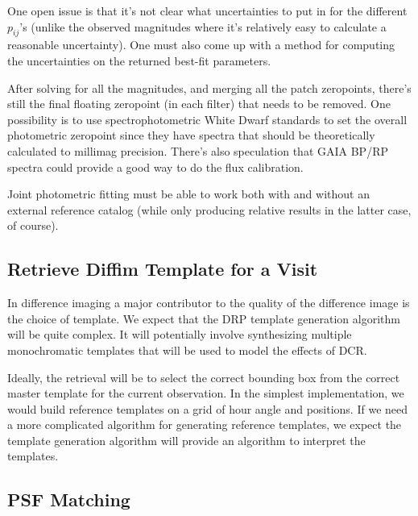 One open issue is that it's not clear what uncertainties to put in for the different $p_{ij}$'s (unlike the observed magnitudes where it's relatively easy to calculate a reasonable uncertainty). One must also come up with a method for computing the uncertainties on the returned best-fit parameters.

After solving for all the magnitudes, and merging all the patch zeropoints, there's still the final floating zeropoint (in each filter) that needs to be removed.  One possibility is to use spectrophotometric White Dwarf standards to set the overall photometric zeropoint since they have spectra that should be theoretically calculated to millimag precision.  There's also speculation that GAIA BP/RP spectra could provide a good way to do the flux calibration.  


Joint photometric fitting must be able to work both with and without an external reference catalog (while only producing relative results in the latter case, of course).

\subsection{Retrieve Diffim Template for a Visit}
\label{sec:acRetrieveTemplate}
In difference imaging a major contributor to the quality of the difference image is the choice of template.  We expect that the DRP template generation algorithm will be quite complex.  It will potentially involve synthesizing multiple monochromatic templates that will be used to model the effects of DCR.

Ideally, the retrieval will be to select the correct bounding box from the correct master template for the current observation.  In the simplest implementation, we would build reference templates on a grid of hour angle and positions.  If we need a more complicated algorithm for generating reference templates, we expect the template generation algorithm will provide an algorithm to interpret the templates.

\subsection{PSF Matching}
\label{sec:acPSFMatching}

